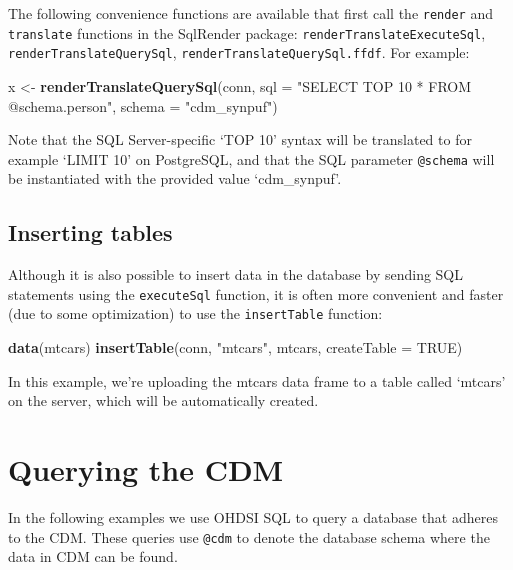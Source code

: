 \documentclass[11pt]{book}
\newenvironment{Shaded}{\begin{snugshade}}{\end{snugshade}}
\newcommand{\KeywordTok}[1]{\textcolor[rgb]{0.13,0.29,0.53}{\textbf{#1}}}
\newcommand{\DataTypeTok}[1]{\textcolor[rgb]{0.13,0.29,0.53}{#1}}
\newcommand{\StringTok}[1]{\textcolor[rgb]{0.31,0.60,0.02}{#1}}
\newcommand{\OtherTok}[1]{\textcolor[rgb]{0.56,0.35,0.01}{#1}}
\newcommand{\NormalTok}[1]{#1}
\begin{document}
The following convenience functions are available that first call the
\texttt{render} and \texttt{translate} functions in the SqlRender
package: \texttt{renderTranslateExecuteSql},
\texttt{renderTranslateQuerySql}, \texttt{renderTranslateQuerySql.ffdf}.
For example:

\begin{Shaded}
\begin{Highlighting}[]
\NormalTok{x <-}\StringTok{ }\KeywordTok{renderTranslateQuerySql}\NormalTok{(conn, }
                             \DataTypeTok{sql =} \StringTok{"SELECT TOP 10 * FROM @schema.person"}\NormalTok{,}
                             \DataTypeTok{schema =} \StringTok{"cdm_synpuf"}\NormalTok{)}
\end{Highlighting}
\end{Shaded}

Note that the SQL Server-specific `TOP 10' syntax will be translated to
for example `LIMIT 10' on PostgreSQL, and that the SQL parameter
\texttt{@schema} will be instantiated with the provided value
`cdm\_synpuf'.

\subsection{Inserting tables}\label{inserting-tables}

Although it is also possible to insert data in the database by sending
SQL statements using the \texttt{executeSql} function, it is often more
convenient and faster (due to some optimization) to use the
\texttt{insertTable} function:

\begin{Shaded}
\begin{Highlighting}[]
\KeywordTok{data}\NormalTok{(mtcars)}
\KeywordTok{insertTable}\NormalTok{(conn, }\StringTok{"mtcars"}\NormalTok{, mtcars, }\DataTypeTok{createTable =} \OtherTok{TRUE}\NormalTok{)}
\end{Highlighting}
\end{Shaded}

In this example, we're uploading the mtcars data frame to a table called
`mtcars' on the server, which will be automatically created.

\section{Querying the CDM}\label{QueryTheCdm}

In the following examples we use OHDSI SQL to query a database that
adheres to the CDM. These queries use \texttt{@cdm} to denote the
database schema where the data in CDM can be found.
\end{document}
